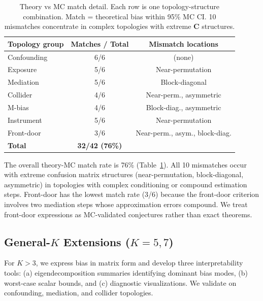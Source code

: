 \documentclass[11pt]{article}
\newcommand{\Cmat}{\mathbf{C}}
\begin{document}
\begin{table}[t]
\centering
\caption{Theory vs MC match detail. Each row is one topology-structure combination. Match = theoretical bias within 95\% MC CI. 10 mismatches concentrate in complex topologies with extreme $\Cmat$ structures.}
\label{tab:theory-mc}
\small
\begin{tabular}{lcc}
\toprule
Topology group & Matches / Total & Mismatch locations \\
\midrule
Confounding & 6/6 & (none) \\
Exposure & 5/6 & Near-permutation \\
Mediation & 5/6 & Block-diagonal \\
Collider & 4/6 & Near-perm., asymmetric \\
M-bias & 4/6 & Block-diag., asymmetric \\
Instrument & 5/6 & Near-permutation \\
Front-door & 3/6 & Near-perm., asym., block-diag. \\
\midrule
\textbf{Total} & \textbf{32/42 (76\%)} & \\
\bottomrule
\end{tabular}
\end{table}

The overall theory-MC match rate is 76\% (Table~\ref{tab:theory-mc}).
All 10 mismatches occur with extreme confusion matrix structures (near-permutation, block-diagonal, asymmetric) in topologies with complex conditioning or compound estimation steps.
Front-door has the lowest match rate (3/6) because the front-door criterion involves two mediation steps whose approximation errors compound.
We treat front-door expressions as MC-validated conjectures rather than exact theorems.

\subsection{General-$K$ Extensions ($K=5,7$)}\label{sec:general-k}

For $K > 3$, we express bias in matrix form and develop three interpretability tools: (a) eigendecomposition summaries identifying dominant bias modes, (b) worst-case scalar bounds, and (c) diagnostic visualizations.
We validate on confounding, mediation, and collider topologies.
\end{document}
